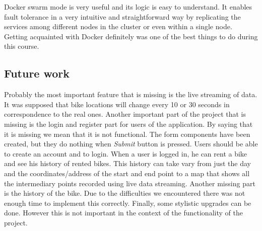 Docker swarm mode is very useful and its logic is easy to understand. It enables fault tolerance in a very intuitive and straightforward way by replicating the services among different nodes in the cluster or even within a single node. Getting acquainted with Docker definitely was one of the best things to do during this course. 

\subsection{Future work}
Probably the most important feature that is missing is the live streaming of data. It was supposed that bike locations will change every 10 or 30 seconds in correspondence to the real ones. Another important part of the project that is missing is the login and register part for users of the application. By saying that it is missing we mean that it is not functional. The form components have been created, but they do nothing when \textit{Submit} button is pressed. Users should be able to create an account and to login. When a user is logged in, he can rent a bike and see his history of rented bikes. This history can take vary from just the day and the coordinates/address of the start and end point to a map that shows all the intermediary points recorded using live data streaming. Another missing part is the history of the bike. Due to the difficulties we encountered there was not enough time to implement this correctly. Finally, some stylistic upgrades can be done. However this is not important in the context of the functionality of the project.
